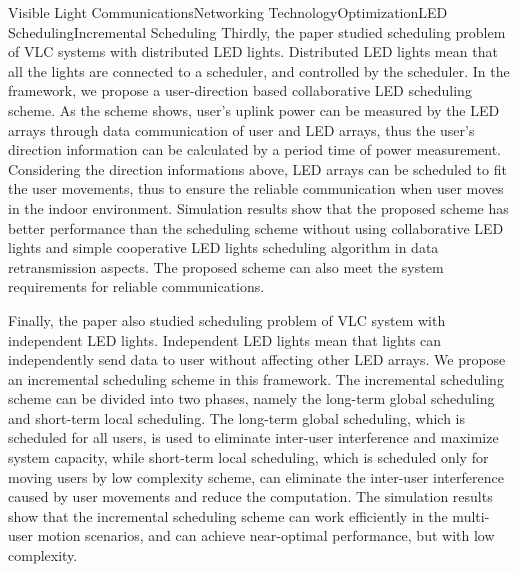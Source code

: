 \begin{englishabstract}{Visible Light Communications\quad{}Networking Technology\quad{}Optimization\quad{}LED Scheduling\quad{}Incremental Scheduling}
Thirdly, the paper studied scheduling problem of VLC systems with distributed LED lights.
Distributed LED lights mean that all the lights are connected to a scheduler, and controlled by the scheduler.
In the framework, we propose a user-direction based collaborative LED scheduling scheme.
As the scheme shows, user's uplink power can be measured by the LED arrays through data communication of user and LED arrays, thus the user's direction information can be calculated by a period time of power measurement.
Considering the direction informations above, LED arrays can be scheduled to fit the user movements, thus to ensure the reliable communication when user moves in the indoor environment.
Simulation results show that the proposed scheme has better performance than the scheduling scheme without using collaborative LED lights and simple cooperative LED lights scheduling algorithm in data retransmission aspects.
The proposed scheme can also meet the system requirements for reliable communications.

Finally, the paper also studied scheduling problem of VLC system with independent LED lights.
Independent LED lights mean that lights can independently send data to user without affecting other LED arrays.
We propose an incremental scheduling scheme in this framework. The incremental scheduling scheme can be divided into two phases, namely the long-term global scheduling and short-term local scheduling.
The long-term global scheduling, which is scheduled for all users, is used to eliminate inter-user interference and maximize system capacity,
while short-term local scheduling, which is scheduled only for moving users by low complexity scheme, can eliminate the inter-user interference caused by user movements and reduce the computation.
The simulation results show that the incremental scheduling scheme can work efficiently in the multi-user motion scenarios, and can achieve near-optimal performance, but with low complexity.

\end{englishabstract}
